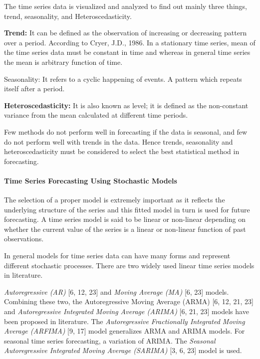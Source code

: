 \documentclass[
  letterpaper,
  DIV=11,
  numbers=noendperiod]{scrartcl}
\let\oldparagraph\paragraph
\renewcommand{\paragraph}[1]{\oldparagraph{#1}\mbox{}}
\begin{document}
The time series data is visualized and analyzed to find out mainly three
things, trend, seasonality, and Heteroscedasticity.

\textbf{Trend:} It can be defined as the observation of increasing or
decreasing pattern over a period. According to Cryer, J.D., 1986. In a
stationary time series, mean of the time series data must be constant in
time and whereas in general time series the mean is arbitrary function
of time.

Seasonality: It refers to a cyclic happening of events. A pattern which
repeats itself after a period.

\textbf{Heteroscedasticity:} It is also known as level; it is defined as
the non-constant variance from the mean calculated at different time
periods.

Few methods do not perform well in forecasting if the data is seasonal,
and few do not perform well with trends in the data. Hence trends,
seasonality and heteroscedasticity must be considered to select the best
statistical method in forecasting.

\hypertarget{time-series-forecasting-using-stochastic-models}{%
\paragraph{\texorpdfstring{\textbf{Time Series Forecasting Using
Stochastic
Models}}{Time Series Forecasting Using Stochastic Models}}\label{time-series-forecasting-using-stochastic-models}}

The selection of a proper model is extremely important as it reflects
the underlying structure of the series and this fitted model in turn is
used for future forecasting. A time series model is said to be linear or
non-linear depending on whether the current value of the series is a
linear or non-linear function of past observations.

In general models for time series data can have many forms and represent
different stochastic processes. There are two widely used linear time
series models in literature.

\emph{Autoregressive (AR)} {[}6, 12, 23{]} and \emph{Moving Average
(MA)} {[}6, 23{]} models. Combining these two, the Autoregressive Moving
Average (ARMA) {[}6, 12, 21, 23{]} and \emph{Autoregressive Integrated
Moving Average (ARIMA)} {[}6, 21, 23{]} models have been proposed in
literature. The \emph{Autoregressive Fractionally Integrated Moving
Average (ARFIMA)} {[}9, 17{]} model generalizes ARMA and ARIMA models.
For seasonal time series forecasting, a variation of ARIMA. The
\emph{Seasonal Autoregressive Integrated Moving Average (SARIMA)} {[}3,
6, 23{]} model is used.
\end{document}
